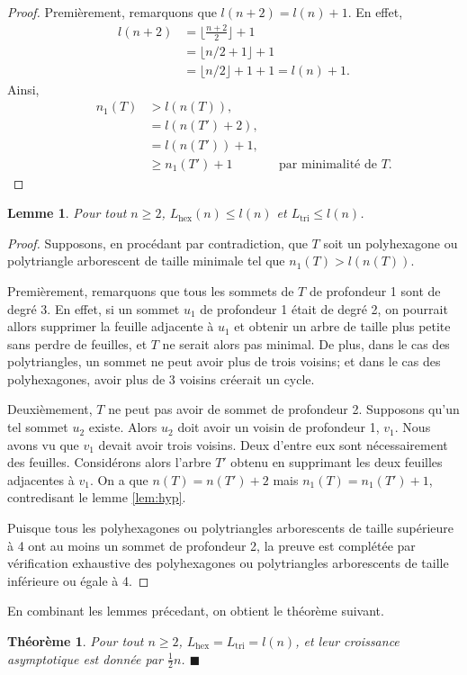 \documentclass{article}
\newtheorem{thm}{Théorème}[section]
\newtheorem{lem}{Lemme}[section]
\theoremstyle{definition}
\newcommand{\Lhex}{L_{\text{hex}}}
\newcommand{\Ltri}{L_{\text{tri}}}
\begin{document}
\begin{proof}
   Premièrement, remarquons que $l(n + 2) = l(n) + 1$. En effet,
   \begin{align*}
      l(n+2) &= \lfloor \frac{n+2}{2} \rfloor + 1 \\
             &= \lfloor n/2 + 1 \rfloor + 1 \\
             &= \lfloor n/2 \rfloor + 1 + 1 = l(n) + 1.
   \end{align*}
   Ainsi,
   \begin{align*}
      && n_1(T) &> l(n(T)), && \\
      &&      &= l(n(T') + 2), && \\
      &&       &= l(n(T')) + 1, &&  \\
      &&       &\geq n_1(T') + 1 && \text{par minimalité de $T$.}
   \end{align*}
\end{proof}

\begin{lem}
   Pour tout $n \geq 2$, $\Lhex(n) \leq l(n)$ et $\Ltri \leq l(n)$.
\end{lem}

\begin{proof}
   Supposons, en procédant par contradiction, que $T$ soit un
   polyhexagone ou polytriangle arborescent de taille minimale 
   tel que $n_1(T) > l(n(T))$.

   Premièrement, remarquons que tous les sommets de $T$ de profondeur 
   1 sont de degré 3. En effet, si un sommet $u_1$ de profondeur 1 
   était de degré 2, on pourrait allors supprimer la feuille adjacente 
   à $u_1$ et obtenir un arbre de taille plus petite sans perdre 
   de feuilles, et $T$ ne serait alors pas minimal. De plus, dans 
   le cas des polytriangles, un sommet ne peut avoir plus de trois
   voisins; et dans le cas des polyhexagones, avoir plus de 3 voisins
   créerait un cycle.

   Deuxièmement, $T$ ne peut pas avoir de sommet de profondeur 2. 
   Supposons qu'un tel sommet $u_2$ existe. Alors $u_2$ doit avoir un 
   voisin de profondeur 1, $v_1$. Nous avons vu que $v_1$ devait avoir 
   trois voisins. Deux d'entre eux sont nécessairement des feuilles. 
   Considérons alors l'arbre $T'$ obtenu en supprimant les deux feuilles 
   adjacentes à $v_1$. On a que $n(T) = n(T') + 2$ mais $n_1(T) = 
   n_1(T') + 1$, contredisant le lemme \ref{lem:hyp}.

   Puisque tous les polyhexagones ou polytriangles arborescents de taille 
   supé\-rieure à 4 ont au moins un sommet de profondeur 2, la preuve est 
   complétée par vérification exhaustive des polyhexagones ou 
   polytriangles arborescents de taille inférieure ou égale à 4.
\end{proof}

En combinant les lemmes précedant, on obtient le théorème suivant.

\begin{thm}
   Pour tout $n \geq 2$, $\Lhex = \Ltri = l(n)$, et leur croissance
   asymptotique est donnée par $\frac{1}{2}n$. \hfill $\blacksquare$
\end{thm}
\end{document}
